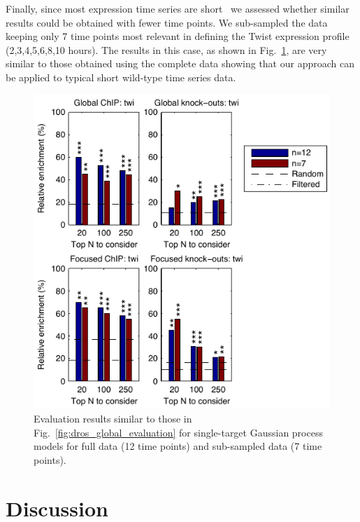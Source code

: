 \documentclass{pnastwo}
\begin{document}
\begin{article}
Finally, since most expression time series are short~\cite{Ernst2005}
we assessed whether similar results could be obtained with fewer time
points. We sub-sampled the data keeping only 7 time points most
relevant in defining the Twist expression profile
(2,3,4,5,6,8,10 hours). The results in this case, as shown in
Fig.~\ref{fig:dros_data_size_evaluation}, are very similar to 
those obtained using the complete data showing that 
our approach
can be applied to typical short wild-type time
series data.

\begin{figure}[tb]
  \centering
  \includegraphics{fig6}
  \caption{Evaluation results similar to those in 
    Fig.~\ref{fig:dros_global_evaluation}
    for single-target Gaussian process models
    for full data (12 time points) and sub-sampled data (7 time points).
    \label{fig:dros_data_size_evaluation}
  }
\end{figure}

\section{Discussion}


\end{article}
\end{document}
